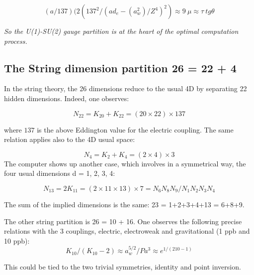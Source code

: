 \documentclass[a4paper,9pt]{article}
\newcounter{row}
\begin{document}
 \begin{equation}\label{Eq41}
 (a/137)(2(137^2/(ad_e -(a_w^2)/Z^4)^2) \approx 9~\mu \approx \tau~ tg \theta
 \end{equation}
 
 \textit{So the U(1)-SU(2) gauge partition is at the heart of the optimal computation process.}
 
 
 
 
 \subsection{The String dimension partition 26 = 22 + 4}
In the string theory, the 26 dimensions reduce to the usual 4D by separating 22 hidden dimensions. Indeed, one observes:

\begin{equation}\label{Eq42}
 N_{22}  = K_{20} + K_{22} = (20\times 22) \times 137
 \end{equation}

where $137$ is the above Eddington value for the electric coupling. The same relation applies also to the 4D usual space:

\begin{equation}\label{Eq43}
 N_4  = K_2 + K_4 = (2\times 4) \times 3
 \end{equation}
%
The computer shows up another case, which involves in a symmetrical way, the four usual dimensions d = 1, 2, 3, 4:

\begin{equation}\label{Eq44}
 N_{13}  = 2K_{11} = (2\times 11 \times 13)\times 7 = N_6N_8N_9/N_1N_2N_3N_4
 \end{equation}

The sum of the implied dimensions is the same: 23 = 1+2+3+4+13 = 6+8+9. 

The other string partition is 26 = 10 + 16. One observes the following precise relations with the 3 couplings, electric, electroweak and gravitational (1 ppb and 10 ppb):
\begin{equation}\label{Eq45}
K_{10}/(K_{10}-2) \approx a_w^{5/2}/ P a^3   \approx e^{1/(210-1)}
 \end{equation}

This could be tied to the two trivial symmetries, identity and point inversion. 
 

\end{document}
